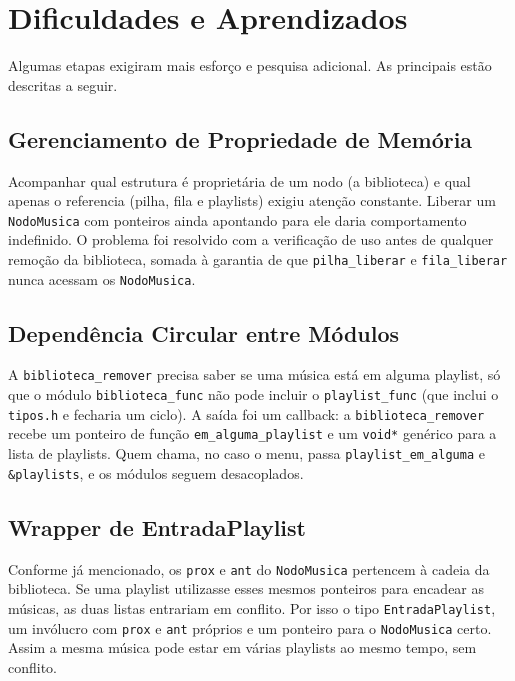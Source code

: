 \documentclass[
    12pt
    ,oneside
    ,a4paper
    ,chapter=TITLE
    ,section=TITLE
    ,sumario=abnt-6027-2012]{abntex2}
\begin{document}
\section{Dificuldades e Aprendizados}

Algumas etapas exigiram mais esforço e pesquisa adicional. As principais estão descritas a seguir.

\subsection{Gerenciamento de Propriedade de Memória}

Acompanhar qual estrutura é proprietária de um nodo (a biblioteca) e qual apenas o referencia (pilha, fila e playlists) exigiu atenção constante. Liberar um \texttt{NodoMusica} com ponteiros ainda apontando para ele daria comportamento indefinido. O problema foi resolvido com a verificação de uso antes de qualquer remoção da biblioteca, somada à garantia de que \texttt{pilha\_liberar} e \texttt{fila\_liberar} nunca acessam os \texttt{NodoMusica}.

\subsection{Dependência Circular entre Módulos}

A \texttt{biblioteca\_remover} precisa saber se uma música está em alguma playlist, só que o módulo \texttt{biblioteca\_func} não pode incluir o \texttt{playlist\_func} (que inclui o \texttt{tipos.h} e fecharia um ciclo). A saída foi um callback: a \texttt{biblioteca\_remover} recebe um ponteiro de função \texttt{em\_alguma\_playlist} e um \texttt{void*} genérico para a lista de playlists. Quem chama, no caso o menu, passa \texttt{playlist\_em\_alguma} e \texttt{\&playlists}, e os módulos seguem desacoplados.

\subsection{Wrapper de EntradaPlaylist}

Conforme já mencionado, os \texttt{prox} e \texttt{ant} do \texttt{NodoMusica} pertencem à cadeia da biblioteca. Se uma playlist utilizasse esses mesmos ponteiros para encadear as músicas, as duas listas entrariam em conflito. Por isso o tipo \texttt{EntradaPlaylist}, um invólucro com \texttt{prox} e \texttt{ant} próprios e um ponteiro para o \texttt{NodoMusica} certo. Assim a mesma música pode estar em várias playlists ao mesmo tempo, sem conflito.
\end{document}
